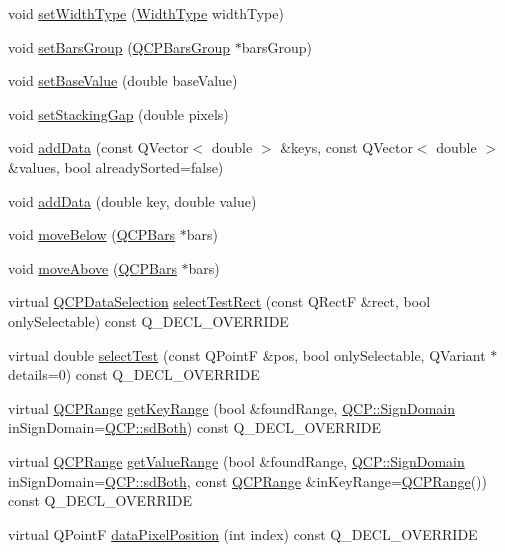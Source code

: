 \begin{DoxyCompactItemize}
\item 
void \hyperlink{classQCPBars_adcaa3b41281bb2c0f7949b341592fcc0}{set\+Width\+Type} (\hyperlink{classQCPBars_a65dbbf1ab41cbe993d71521096ed4649}{Width\+Type} width\+Type)
\item 
void \hyperlink{classQCPBars_aedd1709061f0b307c47ddb45e172ef9a}{set\+Bars\+Group} (\hyperlink{classQCPBarsGroup}{Q\+C\+P\+Bars\+Group} $\ast$bars\+Group)
\item 
void \hyperlink{classQCPBars_a574ec7eb7537566df1a28ff085d75623}{set\+Base\+Value} (double base\+Value)
\item 
void \hyperlink{classQCPBars_aeacf7561afb1c70284b22822b57c7bb5}{set\+Stacking\+Gap} (double pixels)
\item 
void \hyperlink{classQCPBars_a323d6970d6d6e3166d89916a7f60f733}{add\+Data} (const Q\+Vector$<$ double $>$ \&keys, const Q\+Vector$<$ double $>$ \&values, bool already\+Sorted=false)
\item 
void \hyperlink{classQCPBars_a684dd105403a5497fda42f2094fecbb7}{add\+Data} (double key, double value)
\item 
void \hyperlink{classQCPBars_a69fc371346980f19177c3d1ecdad78ee}{move\+Below} (\hyperlink{classQCPBars}{Q\+C\+P\+Bars} $\ast$bars)
\item 
void \hyperlink{classQCPBars_ac22e00a6a41509538c21b04f0a57318c}{move\+Above} (\hyperlink{classQCPBars}{Q\+C\+P\+Bars} $\ast$bars)
\item 
virtual \hyperlink{classQCPDataSelection}{Q\+C\+P\+Data\+Selection} \hyperlink{classQCPBars_ab03bb6125c3e983b89d694f75ce6b3d5}{select\+Test\+Rect} (const Q\+RectF \&rect, bool only\+Selectable) const Q\+\_\+\+D\+E\+C\+L\+\_\+\+O\+V\+E\+R\+R\+I\+DE
\item 
virtual double \hyperlink{classQCPBars_a121f899c27af3186fe93dcd0eb98f49b}{select\+Test} (const Q\+PointF \&pos, bool only\+Selectable, Q\+Variant $\ast$details=0) const Q\+\_\+\+D\+E\+C\+L\+\_\+\+O\+V\+E\+R\+R\+I\+DE
\item 
virtual \hyperlink{classQCPRange}{Q\+C\+P\+Range} \hyperlink{classQCPBars_ac5a3854774d9d9cd129b1eae1426de2d}{get\+Key\+Range} (bool \&found\+Range, \hyperlink{namespaceQCP_afd50e7cf431af385614987d8553ff8a9}{Q\+C\+P\+::\+Sign\+Domain} in\+Sign\+Domain=\hyperlink{namespaceQCP_afd50e7cf431af385614987d8553ff8a9aa38352ef02d51ddfa4399d9551566e24}{Q\+C\+P\+::sd\+Both}) const Q\+\_\+\+D\+E\+C\+L\+\_\+\+O\+V\+E\+R\+R\+I\+DE
\item 
virtual \hyperlink{classQCPRange}{Q\+C\+P\+Range} \hyperlink{classQCPBars_a02cee4bf94d48a1e5f6fc185d9a10477}{get\+Value\+Range} (bool \&found\+Range, \hyperlink{namespaceQCP_afd50e7cf431af385614987d8553ff8a9}{Q\+C\+P\+::\+Sign\+Domain} in\+Sign\+Domain=\hyperlink{namespaceQCP_afd50e7cf431af385614987d8553ff8a9aa38352ef02d51ddfa4399d9551566e24}{Q\+C\+P\+::sd\+Both}, const \hyperlink{classQCPRange}{Q\+C\+P\+Range} \&in\+Key\+Range=\hyperlink{classQCPRange}{Q\+C\+P\+Range}()) const Q\+\_\+\+D\+E\+C\+L\+\_\+\+O\+V\+E\+R\+R\+I\+DE
\item 
virtual Q\+PointF \hyperlink{classQCPBars_a55cdaf565cd3384158d1f7f89533bc2d}{data\+Pixel\+Position} (int index) const Q\+\_\+\+D\+E\+C\+L\+\_\+\+O\+V\+E\+R\+R\+I\+DE
\end{DoxyCompactItemize}
